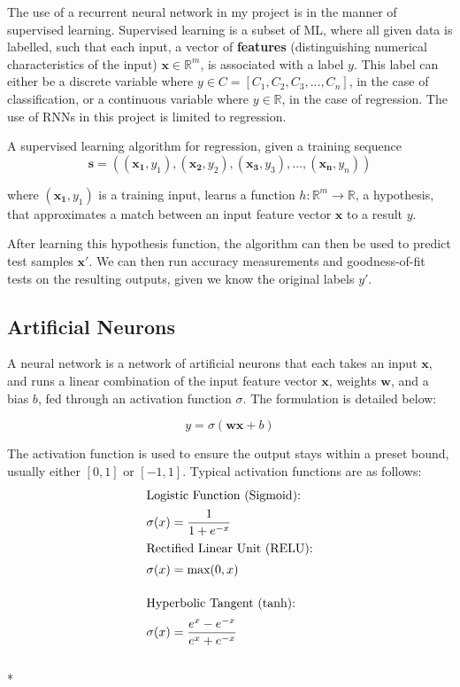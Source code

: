 \documentclass[12pt,a4paper,twoside,openright]{report}
\renewcommand{\vec}[1]{\mathbf{#1}}
\newcommand{\R}{\mathbb{R}}
\begin{document}
The use of a recurrent neural network in my project is in the manner of
supervised learning. Supervised learning is a subset of ML,
where all given data is labelled, such that each input, a vector of \textbf{features} (distinguishing
numerical characteristics of the input) $\vec{x} \in \R^m$,
is associated with a label $y$. This label can either be a discrete variable where 
$y \in C = [C_1, C_2, C_3, ..., C_n]$,
in the case of classification, or a continuous variable where $y \in \R$, in the case of regression.
The use of RNNs in this project is limited to regression.

A supervised learning algorithm for regression, given a training sequence
\begin{equation}
\vec{s} = ((\vec{x_1}, y_1), (\vec{x_2}, y_2), (\vec{x_3}, y_3), ... , (\vec{x_n}, y_n))
\end{equation}

where $(\vec{x_1}, y_1)$ is a training input, learns a function $h: \R^m \rightarrow \R$,
a hypothesis, that approximates a match between an input feature vector $\vec{x}$ to a
result $y$.

After learning this hypothesis function, the algorithm can then be used to predict test
samples $\vec{x'}$. We can then run accuracy measurements and goodness-of-fit tests on
the resulting outputs, given we know the original labels $y'$.

\subsection{Artificial Neurons}

A neural network is a network of artificial neurons that each takes an input $\vec{x}$,
and runs a linear combination of the input feature vector $\vec{x}$, weights $\vec{w}$, and a bias $b$,
fed through an activation function $\sigma$. The formulation is detailed below:

\begin{equation}
y = \sigma (\vec{wx} + b)
\end{equation}

The activation function is used to ensure the output stays within a preset bound,
usually either $[0,1]$ or $[-1,1]$. Typical activation functions are as follows:
\begin{align}
\intertext{Logistic Function (Sigmoid):}
&\sigma(x) = \frac{1}{1+e^{-x}}\\
\intertext{Rectified Linear Unit (RELU):}
&\sigma(x) = \text{max}(0,x)\\[10pt]
\intertext{Hyperbolic Tangent (tanh):}
&\sigma(x) = \frac{e^x - e^{-x}}{e^x + e^{-x}}
\end{align}\\*
\end{document}
